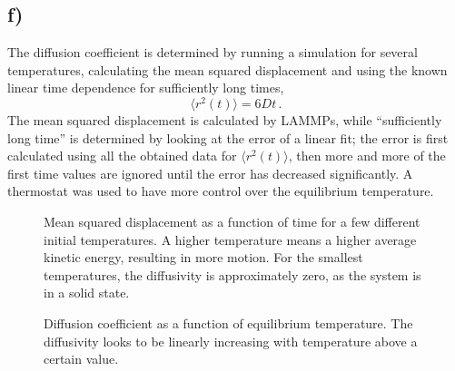 \documentclass[11pt,british,a4paper]{report}
\begin{document}
\clearpage

\subsection*{f)}
The diffusion coefficient is determined by running a simulation for several temperatures, calculating the mean squared displacement and using the known linear time dependence for sufficiently long times,
\[
    \langle r^2(t)\rangle = 6Dt\,.
\]
The mean squared displacement is calculated by LAMMPs, while ``sufficiently long time'' is determined by looking at the error of a linear fit; the error is first calculated using all the obtained data for \(\langle r^2(t)\rangle\), then more and more of the first time values are ignored until the error has decreased significantly. A thermostat was used to have more control over the equilibrium temperature.
\tikzexternaldisable
\begin{figure}[htbp]
    \centering
    \caption{Mean squared displacement as a function of time for a few different initial temperatures. A higher temperature means a higher average kinetic energy, resulting in more motion. For the smallest temperatures, the diffusivity is approximately zero, as the system is in a solid state.}%
    \label{fig:msdtime}
\end{figure}
\begin{figure}[htbp]
    \centering
    \caption{Diffusion coefficient as a function of equilibrium temperature. The diffusivity looks to be linearly increasing with temperature above a certain value.}\label{fig:argonD}
\end{figure}
\end{document}
